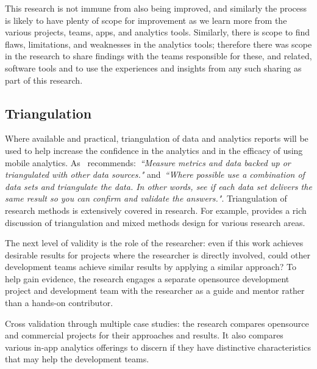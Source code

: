 This research is not immune from also being improved, and similarly the process is likely to have plenty of scope for improvement as we learn more from the various projects, teams, apps, and analytics tools. Similarly, there is scope to find flaws, limitations, and weaknesses in the analytics tools; therefore there was scope in the research to share findings with the teams responsible for these, and related, software tools and to use the experiences and insights from any such sharing as part of this research.


\subsection{Triangulation}
Where available and practical, triangulation %
of data and analytics reports will be used to help increase the confidence in the analytics and in the efficacy of using mobile analytics. As~ recommends:~\emph{``Measure metrics and data backed up or triangulated with other data sources."} and~\emph{``Where possible use a combination of data sets and triangulate the data. In other words, see if each data set delivers the same result so you can confirm and validate the answers."}. Triangulation of research methods is extensively covered in research. For example,  provides a rich discussion of triangulation and mixed methods design for various research areas. %

The next level of validity is the role of the researcher: even if this work achieves desirable results for projects where the researcher is directly involved, could other development teams achieve similar results by applying a similar approach? To help gain evidence, the research engages a separate opensource development project and development team with the researcher as a guide and mentor rather than a hands-on contributor.

Cross validation through multiple case studies: the research compares opensource and commercial projects for their approaches and results. It also compares various in-app analytics offerings to discern if they have distinctive characteristics that may help the development teams.


